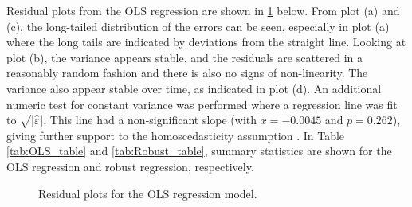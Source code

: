 \label{chapt:appendix_B}
Residual plots from the OLS regression are shown in \cref{fig:residuals_MLR} below. From plot (a) and (c), the long-tailed distribution of the errors can be seen, especially in plot (a) where the long tails are indicated by deviations from the straight line. Looking at plot (b), the variance appears stable, and the residuals are scattered in a reasonably random fashion and there is also no signs of non-linearity. The variance also appear stable over time, as indicated in plot (d). An additional numeric test for constant variance was performed where a regression line was fit to $\sqrt{|\hat{\varepsilon}}|$. This line had a non-significant slope (with $x = -0.0045$ and $p=0.262$), giving further support to the homoscedasticity assumption \cite{Montgomery2012}. In Table \ref{tab:OLS_table} and \ref{tab:Robust_table}, summary statistics are shown for the OLS regression and robust regression, respectively. 

\begin{figure}[h]
\centering
{}
\caption{Residual plots for the OLS regression model.}
\label{fig:residuals_MLR}
\end{figure}

